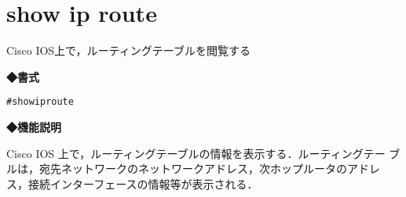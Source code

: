 \section{show ip route}
\label{cmd:show-ip-route}
Cisco IOS上で，ルーティングテーブルを閲覧する\par

\noindent
{\bf ◆書式}
\begin{center}
\begin{screen}
\begin{alltt}
 #show ip route
\end{alltt}
\end{screen}
\end{center}

{\bf ◆機能説明}

Cisco IOS 上で，ルーティングテーブルの情報を表示する．ルーティングテー
ブルは，宛先ネットワークのネットワークアドレス，次ホップルータのアドレ
ス，接続インターフェースの情報等が表示される．

